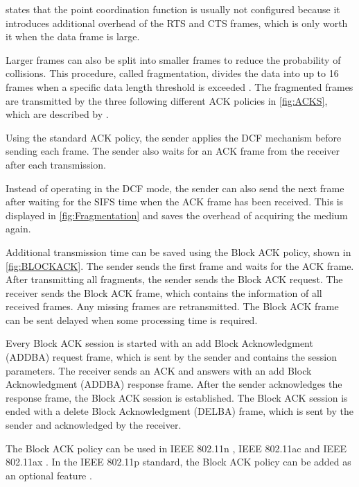 \textcite{sauter_wireless_2022} states that the point coordination function is usually not configured because it introduces additional
overhead of the \ac{RTS} and \ac{CTS} frames, which is only worth it when the data frame is large.

Larger frames can also be split into smaller frames to reduce the probability of collisions.
This procedure, called fragmentation, divides the data into up to \num{16} frames
when a specific data length threshold is exceeded \cite{noauthor_ieee_2021}.
The fragmented frames are transmitted by the three following different \ac{ACK} policies in \autoref{fig:ACKS}, which are described by \textcite{sauter_wireless_2022}.

Using the standard \ac{ACK} policy, the sender applies the \ac{DCF} mechanism before sending each frame.
The sender also waits
for an \ac{ACK} frame from the receiver after each transmission.

Instead of operating in the \ac{DCF} mode, the sender
can also send the next frame after waiting for the \ac{SIFS} time when the \ac{ACK} frame has been received.
This is displayed in \autoref{fig:Fragmentation} and saves the overhead of acquiring the medium again.

Additional transmission time can be saved using the Block \ac{ACK} policy, shown in \autoref{fig:BLOCKACK}.
The sender sends the first frame and waits for the \ac{ACK} frame.
After transmitting all fragments, the sender sends the Block \ac{ACK} request.
The receiver sends the Block \ac{ACK} frame, which contains the information of all received frames.
Any missing frames are retransmitted.
The Block \ac{ACK} frame can be sent delayed when some processing time is required.

Every Block \ac{ACK} session is started with an add Block Acknowledgment (ADDBA) request frame, which is sent by the sender and
contains the session parameters.
The receiver sends an \ac{ACK} and answers with an add Block Acknowledgment (ADDBA) response frame.
After the sender acknowledges the response frame, the Block \ac{ACK} session is established.
The Block \ac{ACK} session is ended with a delete Block Acknowledgment (DELBA) frame, which is sent by the sender and acknowledged by the receiver.

The Block \ac{ACK} policy can be used in IEEE 802.11n \cite{noauthor_ieee_2021-1}, IEEE 802.11ac \cite{noauthor_ieee_2021-1} and IEEE 802.11ax \cite{noauthor_ieee_2021}.
In the IEEE 802.11p standard, the Block \ac{ACK} policy can be added as an optional feature \cite{noauthor_ieee_2021-1}.

